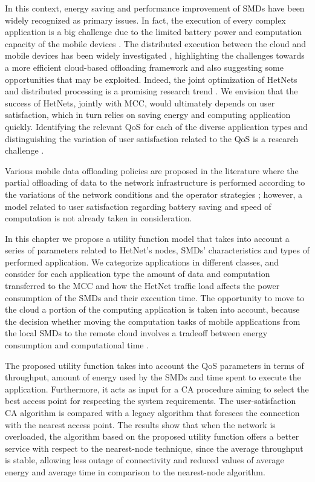 \documentclass[twoside,openright]{report}
\begin{document}
In this context, energy saving and performance improvement of \glspl{SMD} have been widely recognized as primary issues. In fact, the execution of every complex application is a big challenge due to the limited battery power and computation capacity of the mobile devices \cite{Cloud-based}.
The distributed execution between the cloud and mobile devices has been widely investigated \cite{DinhSurvey}, highlighting the challenges towards a more efficient cloud-based offloading framework and also suggesting some opportunities that may be exploited. Indeed, the joint optimization of \glspl{HetNet} and distributed processing is a promising research trend \cite{fantacci09}. We envision that the success of \glspl{HetNet}, jointly with \gls{MCC}, would ultimately depends on user satisfaction, which in turn relies on saving energy and computing application quickly. Identifying the relevant \gls{QoS} for each of the diverse application types and distinguishing the variation of user satisfaction related to the \gls{QoS} is a research challenge \cite{User-satisfaction}. 

Various mobile data offloading policies are proposed in the literature where the partial offloading of data to the network infrastructure is performed according to the variations of the network conditions and the operator strategies \cite{Policies}; however, a model related to user satisfaction regarding battery saving and speed of computation is not already taken in consideration.

In this chapter we propose a utility function model that takes into account a series of parameters related to \gls{HetNet}'s nodes, \glspl{SMD}' characteristics and types of performed application. 
We categorize applications in different classes, and consider for each application type the amount of data and computation transferred to the \gls{MCC} and how the  \gls{HetNet} traffic load affects the power consumption of the \glspl{SMD} and their execution time. 
The opportunity to move to the cloud a portion of the computing application is taken into account, because the decision whether moving the computation tasks of mobile applications from the local \glspl{SMD} to the remote cloud involves a tradeoff between energy consumption and computational time \cite{EUCNC2014}. 

The proposed utility function takes into account the \gls{QoS} parameters in terms of throughput, amount of energy used by the \glspl{SMD} and time spent to execute the application. Furthermore, it acts as input for a \gls{CA} procedure aiming to select the best access point for respecting the system requirements. 
The user-satisfaction \gls{CA} algorithm is compared with a legacy algorithm that foresees the connection with the nearest access point. 
The results show that when the network is overloaded, the algorithm based on the proposed utility function offers a better service with respect to the nearest-node technique, since the average throughput is stable, allowing less outage of connectivity and reduced values of average energy and average time in comparison to the nearest-node algorithm.
\end{document}
